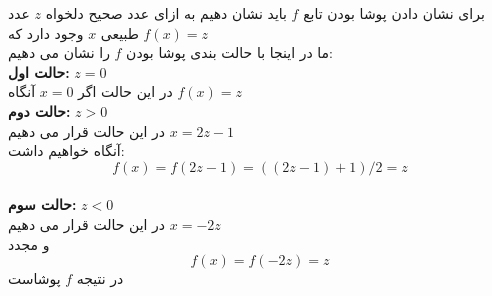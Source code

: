 \begin{ans}
    برای نشان دادن پوشا بودن تابع 
    $f$
    باید نشان دهیم به ازای عدد صحیح دلخواه 
    $z$
    عدد طبیعی
    $x$
    وجود دارد که 
    $f(x) = z$
    \\
    ما در اینجا با حالت بندی پوشا بودن 
    $f$
    را نشان می دهیم:
    \\
    \textbf{حالت اول: } 
    $z = 0$
    \\
    در این حالت اگر
    $x = 0$
    آنگاه
    $f(x) = z$
    \\
    \textbf{حالت دوم:}
    $z > 0$
    \\
    در این حالت قرار می دهیم 
    $x = 2z - 1$
    \\
    آنگاه خواهیم داشت:
    \[f(x) = f(2z-1) = ((2z-1)+1)/2 = z\]
    \\
    \textbf{حالت سوم:}
    $z < 0$
    \\
    در این حالت قرار می دهیم
    $x = -2z$
    \\
    و مجدد
    \[f(x) = f(-2z) = z\]
    در نتیجه
    $f$
    پوشاست 

\end{ans}
